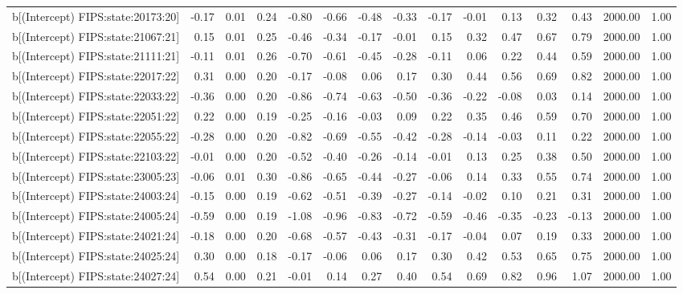 \begin{table}[ht]
\begin{tabular}{rrrrrrrrrrrrrrr}
  b[(Intercept) FIPS:state:20173:20] & -0.17 & 0.01 & 0.24 & -0.80 & -0.66 & -0.48 & -0.33 & -0.17 & -0.01 & 0.13 & 0.32 & 0.43 & 2000.00 & 1.00 \\ 
  b[(Intercept) FIPS:state:21067:21] & 0.15 & 0.01 & 0.25 & -0.46 & -0.34 & -0.17 & -0.01 & 0.15 & 0.32 & 0.47 & 0.67 & 0.79 & 2000.00 & 1.00 \\ 
  b[(Intercept) FIPS:state:21111:21] & -0.11 & 0.01 & 0.26 & -0.70 & -0.61 & -0.45 & -0.28 & -0.11 & 0.06 & 0.22 & 0.44 & 0.59 & 2000.00 & 1.00 \\ 
  b[(Intercept) FIPS:state:22017:22] & 0.31 & 0.00 & 0.20 & -0.17 & -0.08 & 0.06 & 0.17 & 0.30 & 0.44 & 0.56 & 0.69 & 0.82 & 2000.00 & 1.00 \\ 
  b[(Intercept) FIPS:state:22033:22] & -0.36 & 0.00 & 0.20 & -0.86 & -0.74 & -0.63 & -0.50 & -0.36 & -0.22 & -0.08 & 0.03 & 0.14 & 2000.00 & 1.00 \\ 
  b[(Intercept) FIPS:state:22051:22] & 0.22 & 0.00 & 0.19 & -0.25 & -0.16 & -0.03 & 0.09 & 0.22 & 0.35 & 0.46 & 0.59 & 0.70 & 2000.00 & 1.00 \\ 
  b[(Intercept) FIPS:state:22055:22] & -0.28 & 0.00 & 0.20 & -0.82 & -0.69 & -0.55 & -0.42 & -0.28 & -0.14 & -0.03 & 0.11 & 0.22 & 2000.00 & 1.00 \\ 
  b[(Intercept) FIPS:state:22103:22] & -0.01 & 0.00 & 0.20 & -0.52 & -0.40 & -0.26 & -0.14 & -0.01 & 0.13 & 0.25 & 0.38 & 0.50 & 2000.00 & 1.00 \\ 
  b[(Intercept) FIPS:state:23005:23] & -0.06 & 0.01 & 0.30 & -0.86 & -0.65 & -0.44 & -0.27 & -0.06 & 0.14 & 0.33 & 0.55 & 0.74 & 2000.00 & 1.00 \\ 
  b[(Intercept) FIPS:state:24003:24] & -0.15 & 0.00 & 0.19 & -0.62 & -0.51 & -0.39 & -0.27 & -0.14 & -0.02 & 0.10 & 0.21 & 0.31 & 2000.00 & 1.00 \\ 
  b[(Intercept) FIPS:state:24005:24] & -0.59 & 0.00 & 0.19 & -1.08 & -0.96 & -0.83 & -0.72 & -0.59 & -0.46 & -0.35 & -0.23 & -0.13 & 2000.00 & 1.00 \\ 
  b[(Intercept) FIPS:state:24021:24] & -0.18 & 0.00 & 0.20 & -0.68 & -0.57 & -0.43 & -0.31 & -0.17 & -0.04 & 0.07 & 0.19 & 0.33 & 2000.00 & 1.00 \\ 
  b[(Intercept) FIPS:state:24025:24] & 0.30 & 0.00 & 0.18 & -0.17 & -0.06 & 0.06 & 0.17 & 0.30 & 0.42 & 0.53 & 0.65 & 0.75 & 2000.00 & 1.00 \\ 
  b[(Intercept) FIPS:state:24027:24] & 0.54 & 0.00 & 0.21 & -0.01 & 0.14 & 0.27 & 0.40 & 0.54 & 0.69 & 0.82 & 0.96 & 1.07 & 2000.00 & 1.00 \\ 

\end{tabular}
\end{table}
